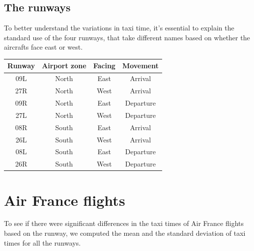 \documentclass{article}
\begin{document}
\subsection{The runways}
To better understand the variations in taxi time, it's essential to explain the standard use of the four runways, that take different names based on whether the aircrafts face east or west. 
\begin{center}
	
\begin{tabular}{c|c|c|c}
	\centering
	\textbf{Runway} & \textbf{Airport zone} & \textbf{Facing} & \textbf{Movement}\\
	\hline
	09L & North & East & Arrival \\
	27R & North & West & Arrival \\
	09R & North & East & Departure\\
	27L & North & West & Departure\\
	08R & South & East & Arrival\\
	26L & South & West & Arrival\\
	08L & South & East & Departure\\
	26R & South & West & Departure\\	
\end{tabular}
\end{center}

\section{Air France flights}
To see if there were significant differences in the taxi times of Air France flights based on the runway, we computed the mean and the standard deviation of taxi times for all the runways.
\end{document}
